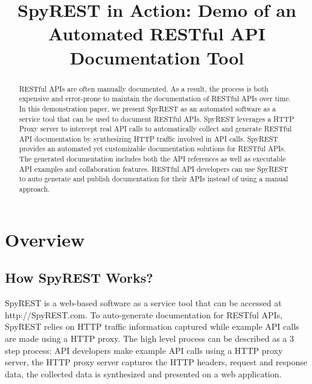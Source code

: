 \documentclass[conference]{IEEEtran}
\begin{document}
\title{SpyREST in Action: Demo of an Automated RESTful API Documentation Tool}

\author{
}
\maketitle


\begin{abstract}
RESTful APIs are often manually documented. As a result, the process is both expensive and error-prone to maintain the documentation of RESTful APIs over time. In this demonstration paper, we present SpyREST as an automated software as a service tool that can be used to document RESTful APIs. SpyREST leverages a HTTP Proxy server to intercept real API calls to automatically collect and generate RESTful API documentation by synthesizing HTTP traffic involved in API calls. SpyREST provides an automated yet customizable documentation solutions for RESTful APIs. The generated documentation includes both the API references as well as executable API examples and collaboration features. RESTful API developers can use SpyREST to auto generate and publish documentation for their APIs instead of using a manual approach.

\end{abstract}

\IEEEpeerreviewmaketitle

\section{Overview}

\subsection{How SpyREST Works?} %
\label{sub:how_it_works}

SpyREST is a web-based software as a service tool that can be accessed at http://SpyREST.com. To auto-generate documentation for RESTful APIs, SpyREST relies on HTTP traffic information captured while example API calls are made using a HTTP proxy. The high level process can be described as a 3 step process: API developers make example API calls using a HTTP proxy server, the HTTP proxy server captures the HTTP headers, request and response data, the collected data is synthesized and presented on a web application.
\end{document}
